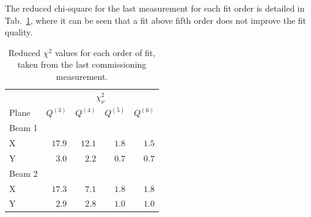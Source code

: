 The reduced chi-square for the last measurement for each fit order is detailed in Tab.~\ref{table_chisquare}, where it can be seen that a fit above fifth order does not improve the fit quality.

\begin{table}[!htb]
    \centering
    \begin{tabular}{lrrrr}
     \toprule
                  & \multicolumn{4}{c}{$\chi^2_\nu$} \\
        Plane     &   $Q^{(3)}$ &  $Q^{(4)}$ &   $Q^{(5)}$ &   $Q^{(6)}$  \\
      \midrule
        Beam 1    &   &   &   & \\
        \hspace{2mm}X         & $17.9$  & $12.1$ & $1.8$ & $1.5$ \\         %
        \hspace{2mm}Y         & $ 3.0$  & $2.2 $ & $0.7$ & $0.7 $\\          %
        Beam 2    &    &    &   &\\
        \hspace{2mm}X         & $17.3$ & $7.1$ & $1.8$ & $1.8$ \\           %
        \hspace{2mm}Y         & $2.9 $ & $2.8$ & $1.0$ & $1.0$ \\            %
      \bottomrule
    \end{tabular}
    \caption{Reduced $\chi^2$ values for each order of fit, taken from the last commissioning measurement.}
    \label{table_chisquare}
  \end{table}
  






